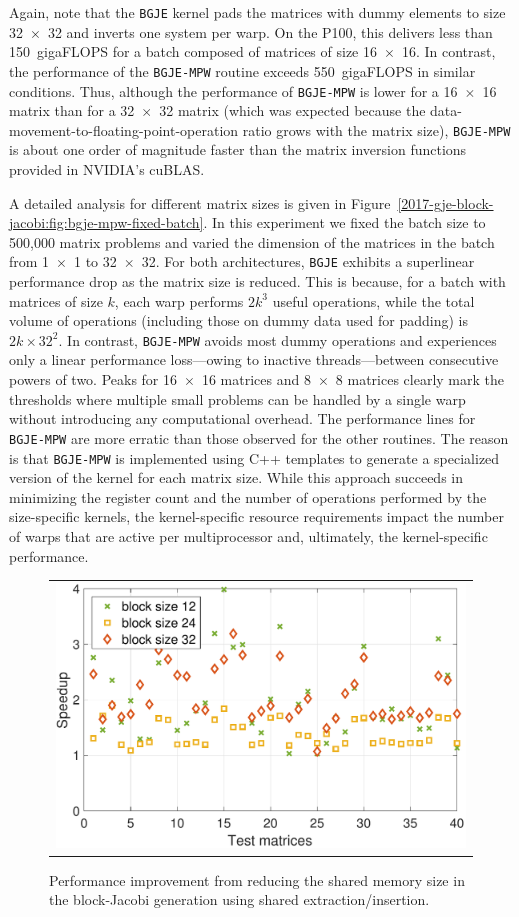 Again, note that the {\tt BGJE} kernel pads the matrices with dummy
elements to size 32~$\times$~32 and inverts one system per warp. On the P100, this
delivers less than 150~gigaFLOPS for a batch composed of matrices of size 16~$\times$~16. 
In contrast, the performance of the {\tt BGJE-MPW} routine exceeds 550~gigaFLOPS in similar conditions.
Thus, although the performance of {\tt BGJE-MPW} is lower for a 16~$\times$~16 matrix
than for a 32~$\times$~32 matrix (which was expected because the
data-movement-to-floating-point-operation ratio grows with the matrix
size), {\tt BGJE-MPW} is about one order of magnitude faster than the matrix
inversion functions provided in NVIDIA's cuBLAS.

A detailed analysis for different matrix sizes is given in
Figure~\ref{2017-gje-block-jacobi:fig:bgje-mpw-fixed-batch}. In this experiment we fixed the batch
size to 500,000 matrix problems and varied the dimension of the matrices in the
batch from 1~$\times$~1 to 32~$\times$~32. For both architectures, {\tt BGJE} exhibits a superlinear
performance drop as the matrix size is reduced. This is because,
for a batch with matrices of size $k$, each warp performs $2k^3$ useful
operations, while the total volume of operations (including those on dummy data
used for padding) is $2k \times 32^2$. In contrast, {\tt BGJE-MPW} avoids most
dummy operations and experiences only a linear performance loss---owing to
inactive threads---between consecutive powers of two. Peaks for 16~$\times$~16 matrices and
8~$\times$~8 matrices clearly mark the thresholds where multiple small problems can be handled by a
single warp without introducing any computational overhead. The performance
lines for {\tt BGJE-MPW} are more erratic than those observed for the other
routines. The reason is that {\tt BGJE-MPW} is implemented using C++ templates
to generate a specialized version of the kernel for each matrix size. While this
approach succeeds in minimizing the register count and the number of operations
performed by the size-specific kernels, the kernel-specific resource
requirements impact the number of warps that are active per multiprocessor and,
ultimately, the kernel-specific performance.

\begin{figure}
\begin{center}
{\scriptsize
\begin{tabular}{c}
\includegraphics[width=.48\columnwidth]{plots/shared_mem_improvement.pdf}
\end{tabular}
}
\end{center}
\caption{
Performance improvement from reducing the shared memory size in the 
block-Jacobi generation using shared extraction/insertion.
}
\label{2017-gje-block-jacobi:fig:reducedshared}
\end{figure}
